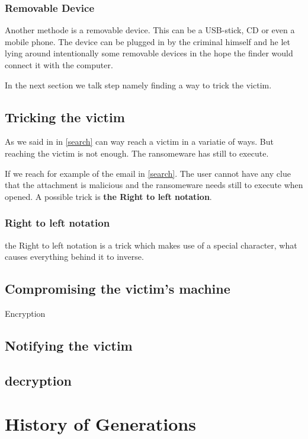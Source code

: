 \subsubsection{Removable Device}

Another methode is a removable device. This can be a USB-stick, CD or even a mobile phone. The device can be plugged in by the criminal himself and he let lying around intentionally some removable devices in the hope the finder would connect it with the computer.

In the next section we talk step namely finding a way to trick the victim.

\subsection{Tricking the victim}

As we said in in \ref{search} can way reach a victim in a variatie of ways. But reaching the victim is not enough. The ransomeware has still to execute.

If we reach for example of the email in \ref{search}. The user cannot have any clue that the attachment is malicious and the ransomeware needs still to execute when opened. A possible trick is \textbf{the Right to left notation}.
\subsubsection{Right to left notation}

the Right to left notation is a trick which makes use of a special character, what causes everything behind it to inverse.

\subsection{Compromising the victim's machine}\label{Compromising}

Encryption
\subsection{Notifying the victim}\label{notify}


\subsection{decryption}\label{decryption}



\section{History of Generations}\label{History of Generations}